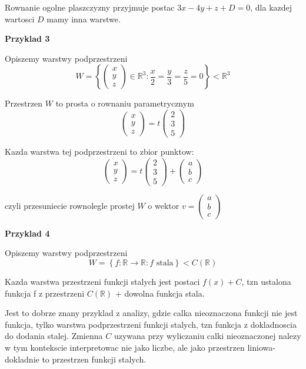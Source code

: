 \documentclass{article}
\begin{document}
Rownanie ogolne plaszczyzny przyjmuje postac $3x - 4y + z + D = 0$, dla kazdej wartosci $D$ mamy inna warstwe.

\textbf{Przyklad 3} 


Opiszemy warstwy podprzestrzeni $$W = \left\{ \begin{pmatrix} x\\ y\\z\end{pmatrix} \in \mathbb{R}^{3}: \frac{x}{2} = \frac{y}{3} = \frac{z}{5}= 0 \right\} <  \mathbb{R}^{3}$$

Przestrzen $W$ to prosta o rownaniu parametrycznym $$\begin{pmatrix} x\\y\\z
\end{pmatrix} = 
t \begin{pmatrix} 2\\3\\5 \end{pmatrix}$$

Kazda warstwa tej podprzestrzeni to zbior punktow:
$$ 
\begin{pmatrix} x\\y\\z
\end{pmatrix} = 
t \begin{pmatrix} 2\\3\\5 \end{pmatrix} +
\begin{pmatrix} a\\b\\c \end{pmatrix} 
$$

czyli przesuniecie rownolegle prostej $W$ o wektor $v = \begin{pmatrix} a\\b\\c
\end{pmatrix}$

\textbf{Przyklad 4}

Opiszemy warstwy podprzestrzeni $$W = \left\{f:  \mathbb{R} \rightarrow \mathbb{R}: f \text{ stala}\right\} < C(\mathbb{R})$$

Kazda warstwa przestrzeni funkcji stalych jest postaci $f(x) + C$, tzn ustalona funkcja f z przestrzeni $C(\mathbb{R})$ + dowolna funkcja stala. 

Jest to dobrze znany przyklad z analizy, gdzie calka nieoznaczona funkcji nie jest funkcja, tylko warstwa podprzestrzeni funkcji stalych, tzn funkcja z dokladnoscia do dodania stalej. Zmienna $C$ uzywana przy wyliczaniu calki nieoznaczonej nalezy w tym kontekscie interpretowac nie jako liczbe, ale jako przestrzen liniowa- dokladnie to przestrzen funkcji stalych.
\end{document}
